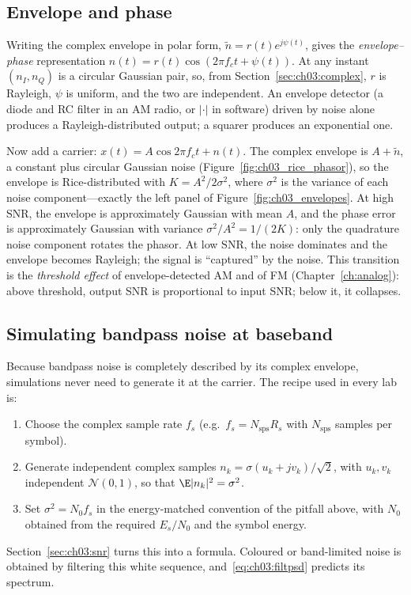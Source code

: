 \subsection{Envelope and phase}

Writing the complex envelope in polar form, $\tilde n=r(t)e^{j\psi(t)}$, gives the
\emph{envelope--phase} representation $n(t)=r(t)\cos(2\pi f_ct+\psi(t))$. At any instant
$(n_I,n_Q)$ is a circular Gaussian pair, so, from Section~\ref{sec:ch03:complex}, $r$ is Rayleigh,
$\psi$ is uniform, and the two are independent. An envelope detector (a diode and RC filter in an AM
radio, or $|\cdot|$ in software) driven by noise alone produces a Rayleigh-distributed output; a
squarer produces an exponential one.

Now add a carrier: $x(t)=A\cos2\pi f_ct+n(t)$. The complex envelope is $A+\tilde n$, a constant plus
circular Gaussian noise (Figure~\ref{fig:ch03_rice_phasor}), so the envelope is Rice-distributed with $K=A^2/2\sigma^2$, where $\sigma^2$
is the variance of each noise component---exactly the left panel of Figure~\ref{fig:ch03_envelopes}.
At high SNR, the envelope is approximately Gaussian with mean $A$, and the phase error is
approximately Gaussian with variance $\sigma^2/A^2=1/(2K)$: only the quadrature noise component
rotates the phasor. At low SNR, the noise dominates and the envelope becomes Rayleigh; the signal is
``captured'' by the noise. This transition is the \emph{threshold effect} of envelope-detected AM and
of FM (Chapter~\ref{ch:analog}): above threshold, output SNR is proportional to input SNR; below it,
it collapses.

\subsection{Simulating bandpass noise at baseband}

Because bandpass noise is completely described by its complex envelope, simulations never need to
generate it at the carrier. The recipe used in every lab is:
\begin{enumerate}
\item Choose the complex sample rate $f_s$ (e.g.\ $f_s=N_{\text{sps}}R_s$ with $N_{\text{sps}}$
samples per symbol).
\item Generate independent complex samples $n_k=\sigma(u_k+jv_k)/\sqrt2$, with $u_k,v_k$ independent
$\mathcal N(0,1)$, so that $\E|n_k|^2=\sigma^2$.
\item Set $\sigma^2=N_0f_s$ in the energy-matched convention of the pitfall above, with $N_0$ obtained
from the required $E_s/N_0$ and the symbol energy.
\end{enumerate}
Section~\ref{sec:ch03:snr} turns this into a formula. Coloured or band-limited noise is obtained by
filtering this white sequence, and~\eqref{eq:ch03:filtpsd} predicts its spectrum.

